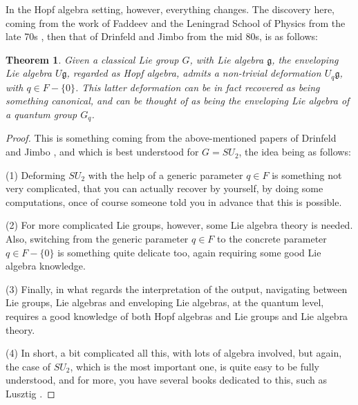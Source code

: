 \documentclass[12pt]{amsbook}
\newtheorem{theorem}{Theorem}[chapter]
\begin{document}
\bigskip

In the Hopf algebra setting, however, everything changes. The discovery here, coming from the work of Faddeev and the Leningrad School of Physics from the late 70s \cite{fad}, then that of Drinfeld \cite{dri} and Jimbo \cite{jim} from the mid 80s, is as follows:


\begin{theorem}
Given a classical Lie group $G$, with Lie algebra $\mathfrak g$, the enveloping Lie algebra $U\mathfrak g$, regarded as Hopf algebra, admits a non-trivial deformation $U_q\mathfrak g$, with $q\in F-\{0\}$. This latter deformation can be in fact recovered as being something canonical, and can be thought of as being the enveloping Lie algebra of a quantum group $G_q$.
\end{theorem}

\begin{proof}
This is something coming from the above-mentioned papers of Drinfeld \cite{dri} and Jimbo \cite{jim}, and which is best understood for $G=SU_2$, the idea being as follows:

\medskip

(1) Deforming $SU_2$ with the help of a generic parameter $q\in F$ is something not very complicated, that you can actually recover by yourself, by doing some computations, once of course someone told you in advance that this is possible. 

\medskip

(2) For more complicated Lie groups, however, some Lie algebra theory is needed. Also, switching from the generic parameter $q\in F$ to the concrete parameter $q\in F-\{0\}$ is something quite delicate too, again requiring some good Lie algebra knowledge. 

\medskip

(3) Finally, in what regards the interpretation of the output, navigating between Lie groups, Lie algebras and enveloping Lie algebras, at the quantum level, requires a good knowledge of both Hopf algebras and Lie groups and Lie algebra theory.

\medskip

(4) In short, a bit complicated all this, with lots of algebra involved, but again, the case of $SU_2$, which is the most important one, is quite easy to be fully understood, and for more, you have several books dedicated to this, such as Lusztig \cite{lus}.
\end{proof}
\end{document}
